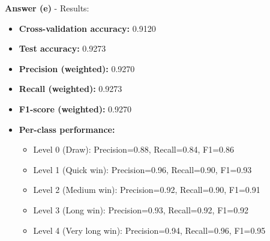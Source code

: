 \documentclass[a4paper,10pt]{article}
\begin{document}
\begin{enumerate}[topsep=0mm, partopsep=0mm, leftmargin=*]
\textbf{Answer (e)} - Results:
\begin{itemize}
	\item \textbf{Cross-validation accuracy:} 0.9120
	\item \textbf{Test accuracy:} 0.9273
	\item \textbf{Precision (weighted):} 0.9270
	\item \textbf{Recall (weighted):} 0.9273
	\item \textbf{F1-score (weighted):} 0.9270
	\item \textbf{Per-class performance:}
	\begin{itemize}
		\item Level 0 (Draw): Precision=0.88, Recall=0.84, F1=0.86
		\item Level 1 (Quick win): Precision=0.96, Recall=0.90, F1=0.93
		\item Level 2 (Medium win): Precision=0.92, Recall=0.90, F1=0.91
		\item Level 3 (Long win): Precision=0.93, Recall=0.92, F1=0.92
		\item Level 4 (Very long win): Precision=0.94, Recall=0.96, F1=0.95
	\end{itemize}
\end{itemize}


\end{enumerate}
\end{document}
